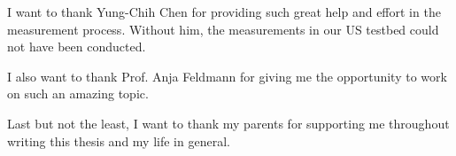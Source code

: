 \documentclass[10pt, oneside]{Thesis} %
\begin{document}
{{%

I want to thank Yung-Chih Chen for providing such great help and effort in the measurement process. 
Without him, the measurements in our US testbed could not have been conducted.  

I also want to thank Prof. Anja Feldmann for giving me the opportunity to work on such an amazing topic. 

Last but not the least, I want to thank my parents for supporting me throughout writing this thesis and my life in general.

}
\clearpage %


\pagestyle{fancy} %

\tableofcontents %

\listoffigures %





}
\end{document}
